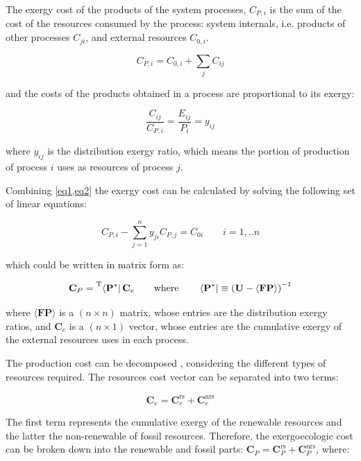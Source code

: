 \documentclass[sustainability,article,submit,moreauthors,pdftex,12pt,a4paper]{mdpi}
\newcommand{\mopcr}[1]{\ensuremath{\left\langle {\textbf{#1}^\ast } \right|}}
\newcommand{\tmopcr}[1]{\ensuremath{\prescript{\mathrm{T}}{}{\left\langle {\textbf{#1}^\ast } \right|}}}
\newcommand{\mbr}[1]{\ensuremath{\langle \textbf{#1} \rangle}}
\newcommand{\vm}[1]{\ensuremath{\mathbf{#1}}}
\newcommand{\vms}[3][\phantom{\ast}]{\ensuremath{\mathbf{#2}_{#3}^\mathrm{#1}}}
\begin{document}
The exergy cost of the products of the system processes, $C_{P,i}$ is the sum of the cost of the resources consumed by the process: system internals, i.e. products of other processes $C_{ji}$, and external resources $C_{0,i}$.

\begin{equation}
 C_{P,i}=C_{0,i}+\sum_{j}C_{ij}
 \label{eq1}
\end{equation}

\noindent and the costs of the products obtained in a process are proportional to its exergy:

\begin{equation}
\frac{C_{ij}}{C_{P,i}}=\frac{E_{ij}}{P_i}=y_{ij}
\label{eq2}
\end{equation}

\noindent where $y_{ij}$ is the distribution exergy ratio, which means the portion of production of process $i$ uses as resources of process $j$.

Combining \cref{eq1,eq2} the exergy cost can be calculated by solving the following set of linear equations:

\begin{equation}
C_{P,i}-\sum_{j=1}^{n}{y_{ji}C_{P,j}}=C_{0i} \qquad i=1,..n
\end{equation}

\noindent which could be written in matrix form as:

\begin{equation}
 \vm{C}_P =\tmopcr{P} \, \vm{C}_e \qquad \text{where} \qquad \mopcr{P} \equiv \left(\vm{U}-\mbr{FP}\right)^{-1}
 \label{eq4}
\end{equation}

\noindent where \mbr{FP} is a $(n \times n)$ matrix, whose entries are the distribution exergy ratios, and $\vm{C}_e$ is a $(n \times 1)$ vector, whose entries are the cumulative exergy of the external resources uses in each process.

The production cost can be decomposed \cite{Torres2012b}, considering the different types of resources required. The resources cost vector can be separated into two terms:

\begin{equation}
\label{ce}
\vms{C}{e}=\vms[rs]{C}{e}+\vms[nrs]{C}{e} 
\end{equation}

The first term represents the cumulative exergy of the renewable resources and the latter the non-renewable of fossil resources. Therefore, the exergoecologic cost can be broken down into the renewable and fossil parts: $\vms{C}{P}=\vms[rs]{C}{P}+\vms[nrs]{C}{P}$, where:
\end{document}
